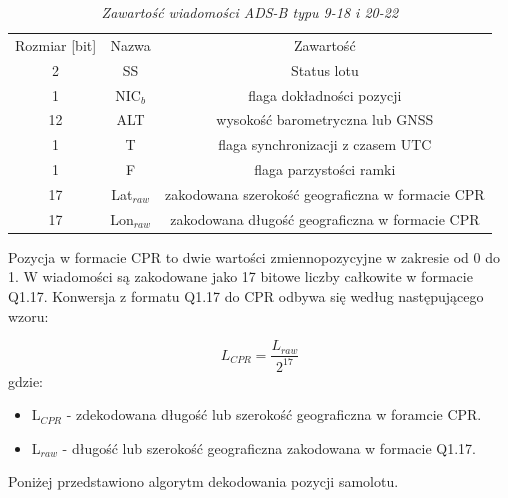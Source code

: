 \documentclass[eng,printmode]{mgr}
\begin{document}
\begin{table}[htb]
\def\arraystretch{1.3}%
\caption{\textit{ Zawartość wiadomości ADS-B typu 9-18 i 20-22}}
\label{tab:adsb}
  \centering
  \def\arraystretch{1.3}%
  \begin{tabular}{|c|c|c|}
  \hline
  
  \multicolumn{1}{|c|}{Rozmiar [bit]} & \multicolumn{1}{c|}{Nazwa} & \multicolumn{1}{c|}{Zawartość} \\\cline{1-3}
  \multicolumn{1}{|c|}{2} & \multicolumn{1}{c|}{SS} & \multicolumn{1}{c|}{Status lotu}\\\cline{1-3}
  \multicolumn{1}{|c|}{1} & \multicolumn{1}{c|}{NIC$_b$} & \multicolumn{1}{c|}{flaga dokładności pozycji}\\\cline{1-3}
  \multicolumn{1}{|c|}{12} & \multicolumn{1}{c|}{ALT} & \multicolumn{1}{c|}{wysokość barometryczna lub GNSS}\\\cline{1-3}
  \multicolumn{1}{|c|}{1} & \multicolumn{1}{c|}{T} & \multicolumn{1}{c|}{flaga synchronizacji z czasem UTC}\\\cline{1-3}
  \multicolumn{1}{|c|}{1} & \multicolumn{1}{c|}{F} & \multicolumn{1}{c|}{flaga parzystości ramki}\\\cline{1-3}
  \multicolumn{1}{|c|}{17} & \multicolumn{1}{c|}{Lat$_{raw}$} & \multicolumn{1}{c|}{zakodowana szerokość geograficzna w formacie CPR}\\\cline{1-3}
  \multicolumn{1}{|c|}{17} & \multicolumn{1}{c|}{Lon$_{raw}$} & \multicolumn{1}{c|}{zakodowana długość geograficzna w formacie CPR}\\\cline{1-3}   
 \end{tabular}
\end{table}
\vskip 0.5cm
Pozycja w formacie CPR to dwie wartości zmiennopozycyjne w zakresie od 0 do 1. W wiadomości są zakodowane jako 17 bitowe liczby całkowite w formacie Q1.17. Konwersja z formatu Q1.17 do CPR odbywa się według następującego wzoru:
\newpage

\begin{equation}
L_{CPR} = \frac{L_{raw}}{2^{17}}
\end{equation}
gdzie:
\begin{itemize}
\item L$_{CPR}$ - zdekodowana długość lub szerokość geograficzna w foramcie CPR.
\item L$_{raw}$ - długość lub szerokość geograficzna zakodowana w formacie Q1.17.
\end{itemize}
\vskip 0.5cm
\noindent
Poniżej przedstawiono algorytm dekodowania pozycji samolotu.
\\
\end{document}

